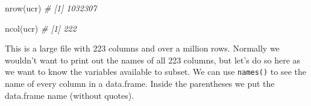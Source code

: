 \documentclass[
]{krantz}
\makeatletter
\newenvironment{Shaded}{\begin{snugshade}}{\end{snugshade}}
\newcommand{\CommentTok}[1]{\textcolor[rgb]{0.37,0.37,0.37}{\textit{#1}}}
\newcommand{\FunctionTok}[1]{\textcolor[rgb]{0,0,0}{#1}}
\newcommand{\NormalTok}[1]{#1}
\newenvironment{kframe}{%
\medskip{}
\setlength{\fboxsep}{.8em}
 \def\at@end@of@kframe{}%
 \ifinner\ifhmode%
  \def\at@end@of@kframe{\end{minipage}}%
  \begin{minipage}{\columnwidth}%
 \fi\fi%
 \def\FrameCommand##1{\hskip\@totalleftmargin \hskip-\fboxsep
 \colorbox{shadecolor}{##1}\hskip-\fboxsep
     \hskip-\linewidth \hskip-\@totalleftmargin \hskip\columnwidth}%
 \MakeFramed {\advance\hsize-\width
   \@totalleftmargin\z@ \linewidth\hsize
   \@setminipage}}%
 {\par\unskip\endMakeFramed%
 \at@end@of@kframe}
\renewenvironment{Shaded}{\begin{kframe}}{\end{kframe}}
\makeatother
\begin{document}
\begin{Shaded}
\begin{Highlighting}[]
\FunctionTok{nrow}\NormalTok{(ucr)}
\CommentTok{\# [1] 1032307}
\end{Highlighting}
\end{Shaded}

\begin{Shaded}
\begin{Highlighting}[]
\FunctionTok{ncol}\NormalTok{(ucr)}
\CommentTok{\# [1] 222}
\end{Highlighting}
\end{Shaded}

This is a large file with 223 columns and over a million
rows. Normally we wouldn't want to print out the names of
all 223 columns, but let's do so here as we want to know the
variables available to subset. We can use \texttt{names()}
to see the name of every column in a data.frame. Inside the
parentheses we put the data.frame name (without quotes).
\end{document}
